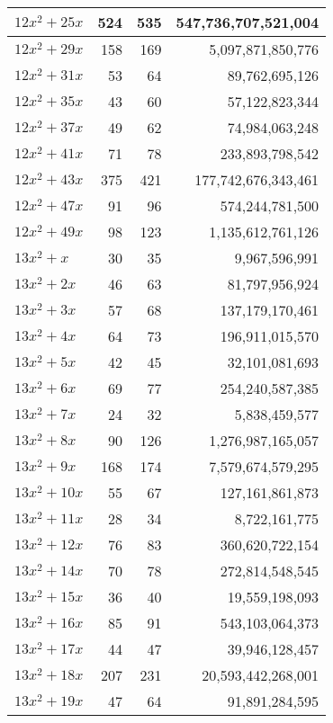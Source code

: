 \documentclass[a4paper]{amsproc}
\theoremstyle{plain}
\theoremstyle{named}
\begin{document}
\begin{longtable}{ | l | r | r | r | }
$12x^2 + 25x$ & 524 & 535 & 547{,}736{,}707{,}521{,}004 \\ \hline
$12x^2 + 29x$ & 158 & 169 & 5{,}097{,}871{,}850{,}776 \\ \hline
$12x^2 + 31x$ & 53 & 64 & 89{,}762{,}695{,}126 \\ \hline
$12x^2 + 35x$ & 43 & 60 & 57{,}122{,}823{,}344 \\ \hline
$12x^2 + 37x$ & 49 & 62 & 74{,}984{,}063{,}248 \\ \hline
$12x^2 + 41x$ & 71 & 78 & 233{,}893{,}798{,}542 \\ \hline
$12x^2 + 43x$ & 375 & 421 & 177{,}742{,}676{,}343{,}461 \\ \hline
$12x^2 + 47x$ & 91 & 96 & 574{,}244{,}781{,}500 \\ \hline
$12x^2 + 49x$ & 98 & 123 & 1{,}135{,}612{,}761{,}126 \\ \hline
$13x^2 + x$ & 30 & 35 & 9{,}967{,}596{,}991 \\ \hline
$13x^2 + 2x$ & 46 & 63 & 81{,}797{,}956{,}924 \\ \hline
$13x^2 + 3x$ & 57 & 68 & 137{,}179{,}170{,}461 \\ \hline
$13x^2 + 4x$ & 64 & 73 & 196{,}911{,}015{,}570 \\ \hline
$13x^2 + 5x$ & 42 & 45 & 32{,}101{,}081{,}693 \\ \hline
$13x^2 + 6x$ & 69 & 77 & 254{,}240{,}587{,}385 \\ \hline
$13x^2 + 7x$ & 24 & 32 & 5{,}838{,}459{,}577 \\ \hline
$13x^2 + 8x$ & 90 & 126 & 1{,}276{,}987{,}165{,}057 \\ \hline
$13x^2 + 9x$ & 168 & 174 & 7{,}579{,}674{,}579{,}295 \\ \hline
$13x^2 + 10x$ & 55 & 67 & 127{,}161{,}861{,}873 \\ \hline
$13x^2 + 11x$ & 28 & 34 & 8{,}722{,}161{,}775 \\ \hline
$13x^2 + 12x$ & 76 & 83 & 360{,}620{,}722{,}154 \\ \hline
$13x^2 + 14x$ & 70 & 78 & 272{,}814{,}548{,}545 \\ \hline
$13x^2 + 15x$ & 36 & 40 & 19{,}559{,}198{,}093 \\ \hline
$13x^2 + 16x$ & 85 & 91 & 543{,}103{,}064{,}373 \\ \hline
$13x^2 + 17x$ & 44 & 47 & 39{,}946{,}128{,}457 \\ \hline
$13x^2 + 18x$ & 207 & 231 & 20{,}593{,}442{,}268{,}001 \\ \hline
$13x^2 + 19x$ & 47 & 64 & 91{,}891{,}284{,}595 \\ \hline

\end{longtable}
\end{document}
